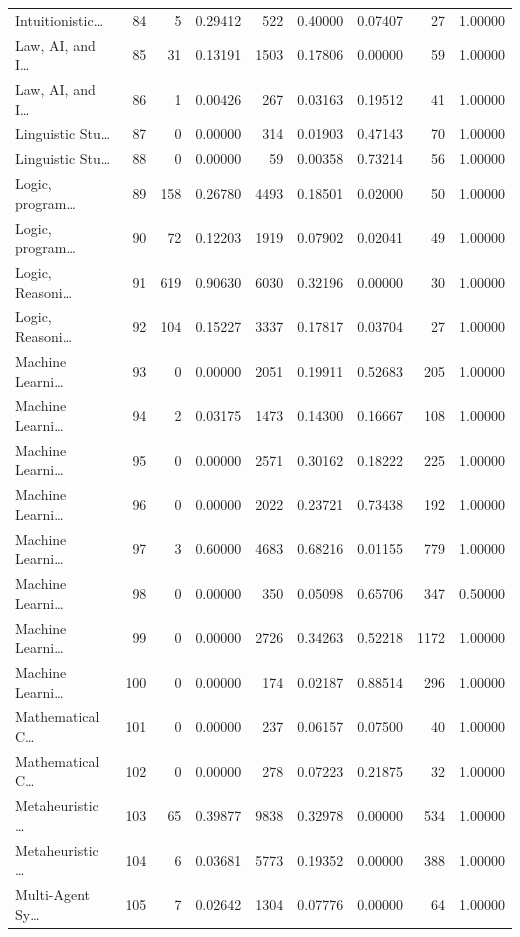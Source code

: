 \begin{table}
\begin{tabular}{lrrrrrrrr}
Intuitionistic… & 84 & 5 & 0.29412 & 522 & 0.40000 & 0.07407 & 27 & 1.00000 \\
Law, AI, and I… & 85 & 31 & 0.13191 & 1503 & 0.17806 & 0.00000 & 59 & 1.00000 \\
Law, AI, and I… & 86 & 1 & 0.00426 & 267 & 0.03163 & 0.19512 & 41 & 1.00000 \\
Linguistic Stu… & 87 & 0 & 0.00000 & 314 & 0.01903 & 0.47143 & 70 & 1.00000 \\
Linguistic Stu… & 88 & 0 & 0.00000 & 59 & 0.00358 & 0.73214 & 56 & 1.00000 \\
Logic, program… & 89 & 158 & 0.26780 & 4493 & 0.18501 & 0.02000 & 50 & 1.00000 \\
Logic, program… & 90 & 72 & 0.12203 & 1919 & 0.07902 & 0.02041 & 49 & 1.00000 \\
Logic, Reasoni… & 91 & 619 & 0.90630 & 6030 & 0.32196 & 0.00000 & 30 & 1.00000 \\
Logic, Reasoni… & 92 & 104 & 0.15227 & 3337 & 0.17817 & 0.03704 & 27 & 1.00000 \\
Machine Learni… & 93 & 0 & 0.00000 & 2051 & 0.19911 & 0.52683 & 205 & 1.00000 \\
Machine Learni… & 94 & 2 & 0.03175 & 1473 & 0.14300 & 0.16667 & 108 & 1.00000 \\
Machine Learni… & 95 & 0 & 0.00000 & 2571 & 0.30162 & 0.18222 & 225 & 1.00000 \\
Machine Learni… & 96 & 0 & 0.00000 & 2022 & 0.23721 & 0.73438 & 192 & 1.00000 \\
Machine Learni… & 97 & 3 & 0.60000 & 4683 & 0.68216 & 0.01155 & 779 & 1.00000 \\
Machine Learni… & 98 & 0 & 0.00000 & 350 & 0.05098 & 0.65706 & 347 & 0.50000 \\
Machine Learni… & 99 & 0 & 0.00000 & 2726 & 0.34263 & 0.52218 & 1172 & 1.00000 \\
Machine Learni… & 100 & 0 & 0.00000 & 174 & 0.02187 & 0.88514 & 296 & 1.00000 \\
Mathematical C… & 101 & 0 & 0.00000 & 237 & 0.06157 & 0.07500 & 40 & 1.00000 \\
Mathematical C… & 102 & 0 & 0.00000 & 278 & 0.07223 & 0.21875 & 32 & 1.00000 \\
Metaheuristic … & 103 & 65 & 0.39877 & 9838 & 0.32978 & 0.00000 & 534 & 1.00000 \\
Metaheuristic … & 104 & 6 & 0.03681 & 5773 & 0.19352 & 0.00000 & 388 & 1.00000 \\
Multi-Agent Sy… & 105 & 7 & 0.02642 & 1304 & 0.07776 & 0.00000 & 64 & 1.00000 \\

\end{tabular}
\end{table}
